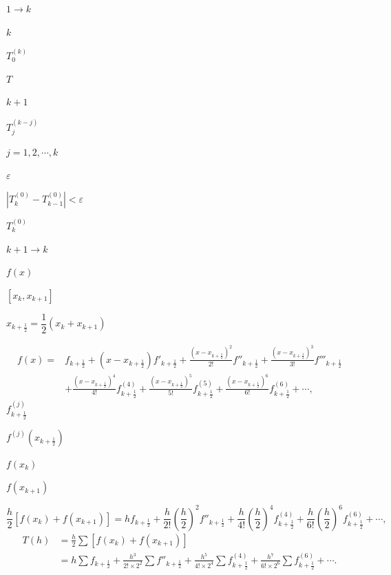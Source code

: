 \documentclass[UTF8,fontset=fandol]{ctexart}
\begin{document}
$1\to k$\par
$k$\par
$T_0^{(k)}$\par
$T$\par
$k+1$\par
$T_j^{(k-j)}$\par
$j=1,2,\cdots,k$\par
$\varepsilon$\par
$|T_k^{(0)}-T_{k-1}^{(0)}|<\varepsilon$\par
$T_k^{(0)}$\par
$k+1\to k$\par
$f(x)$\par
$[x_k,x_{k+1}]$\par
$x_{k+\frac12}=\dfrac12(x_k+x_{k+1})$\par
\[ 
\begin{aligned}
f(x)={}&f_{k+\frac12}+(x-x_{k+\frac12})f'_{k+\frac12}
+\frac{(x-x_{k+\frac12})^2}{2!}f''_{k+\frac12}
+\frac{(x-x_{k+\frac12})^3}{3!}f'''_{k+\frac12}\\
&+\frac{(x-x_{k+\frac12})^4}{4!}f^{(4)}_{k+\frac12}
+\frac{(x-x_{k+\frac12})^5}{5!}f^{(5)}_{k+\frac12}
+\frac{(x-x_{k+\frac12})^6}{6!}f^{(6)}_{k+\frac12}+\cdots,
\end{aligned}
\tag{4.3.14}
 \]
$f^{(j)}_{k+\frac12}$\par
$f^{(j)}(x_{k+\frac12})$\par
$f(x_k)$\par
$f(x_{k+1})$\par
\[ 
\frac h2[f(x_k)+f(x_{k+1})]
=hf_{k+\frac12}+\frac h{2!}\left(\frac h2\right)^2f''_{k+\frac12}
+\frac h{4!}\left(\frac h2\right)^4f^{(4)}_{k+\frac12}
+\frac h{6!}\left(\frac h2\right)^6f^{(6)}_{k+\frac12}+\cdots,
 \]
\[ 
\begin{aligned}
T(h)&=\frac h2\sum[f(x_k)+f(x_{k+1})]\\
&=h\sum f_{k+\frac12}+\frac{h^3}{2!\times2^2}\sum f''_{k+\frac12}
+\frac{h^5}{4!\times2^4}\sum f^{(4)}_{k+\frac12}
+\frac{h^7}{6!\times2^6}\sum f^{(6)}_{k+\frac12}+\cdots.
\end{aligned}
\tag{4.3.15}
 \]
\end{document}
